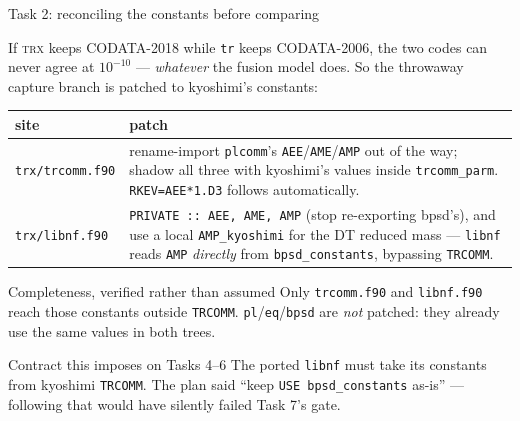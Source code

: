 \documentclass[10pt,aspectratio=169]{beamer}
\newcommand{\C}[1]{\texttt{\small #1}}          %
\begin{document}
\begin{frame}{Task 2: reconciling the constants before comparing}

If \textsc{trx} keeps CODATA-2018 while \C{tr} keeps CODATA-2006, the two codes can never agree at
$10^{-10}$ --- \emph{whatever} the fusion model does. So the throwaway capture branch is patched to
kyoshimi's constants:

\vspace{0.4em}
\begin{center}
\small
\begin{tabular}{@{}lp{}@{}}
\toprule
site & patch \\
\midrule
\C{trx/trcomm.f90} & rename-import \C{plcomm}'s \C{AEE}/\C{AME}/\C{AMP} out of the way; shadow all three with
                     kyoshimi's values inside \C{trcomm\_parm}. \C{RKEV=AEE*1.D3} follows automatically. \\
\C{trx/libnf.f90}  & \C{PRIVATE :: AEE, AME, AMP} (stop re-exporting bpsd's), and use a local
                     \C{AMP\_kyoshimi} for the DT reduced mass --- \C{libnf} reads \C{AMP} \emph{directly}
                     from \C{bpsd\_constants}, bypassing \C{TRCOMM}. \\
\bottomrule
\end{tabular}
\end{center}

\vspace{0.4em}
\begin{block}{Completeness, verified rather than assumed}
Only \C{trcomm.f90} and \C{libnf.f90} reach those constants outside \C{TRCOMM}. \C{pl}/\C{eq}/\C{bpsd} are
\emph{not} patched: they already use the same values in both trees.
\end{block}

\begin{alertblock}{Contract this imposes on Tasks 4--6}
The ported \C{libnf} must take its constants from kyoshimi \C{TRCOMM}. The plan said
``keep \C{USE bpsd\_constants} as-is'' --- following that would have silently failed Task 7's gate.
\end{alertblock}
\end{frame}
\end{document}
